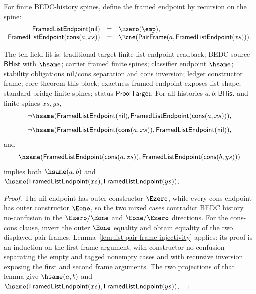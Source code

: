 \begin{definition}
\label{def:framed-list-endpoint}
For finite BEDC-history spines, define the framed endpoint by recursion on the
spine:
$$
\begin{array}{rcl}
\mathsf{FramedListEndpoint}(\mathsf{nil}) &=& \Ezero(\emp),\\
\mathsf{FramedListEndpoint}(\mathsf{cons}(a,xs)) &=&
\Eone(\mathsf{PairFrame}(a,\mathsf{FramedListEndpoint}(xs))).
\end{array}
$$
\end{definition}

\begin{theorem}
\label{thm:framed-list-endpoint-no-confusion-cons-inversion}
The ten-field fit is: traditional target finite-list endpoint readback; BEDC
source $\mathsf{BHist}$ with $\hsame$; carrier framed finite spines; classifier
endpoint $\hsame$; stability obligations nil/cons separation and cons inversion;
ledger constructor frame; core theorem this block; exactness framed endpoint
exposes list shape; standard bridge finite spines; status
$\mathsf{ProofTarget}$. For all histories $a,b:\mathsf{BHist}$ and finite
spines $xs,ys$,
$$
\neg\hsame(\mathsf{FramedListEndpoint}(\mathsf{nil}),
\mathsf{FramedListEndpoint}(\mathsf{cons}(a,xs))),
$$
$$
\neg\hsame(\mathsf{FramedListEndpoint}(\mathsf{cons}(a,xs)),
\mathsf{FramedListEndpoint}(\mathsf{nil})),
$$
and
$$
\hsame(\mathsf{FramedListEndpoint}(\mathsf{cons}(a,xs)),
\mathsf{FramedListEndpoint}(\mathsf{cons}(b,ys)))
$$
implies both $\hsame(a,b)$ and
$\hsame(\mathsf{FramedListEndpoint}(xs),\mathsf{FramedListEndpoint}(ys))$.
\end{theorem}
\begin{proof}
The nil endpoint has outer constructor $\Ezero$, while every cons endpoint has
outer constructor $\Eone$, so the two mixed cases contradict BEDC history
no-confusion in the $\Ezero/\Eone$ and $\Eone/\Ezero$ directions. For the
cons-cons clause, invert the outer $\Eone$ equality and obtain equality of the
two displayed pair frames. Lemma~\ref{lem:list-pair-frame-injectivity} applies:
its proof is an induction on the first frame argument, with constructor
no-confusion separating the empty and tagged nonempty cases and with recursive
inversion exposing the first and second frame arguments. The two projections of
that lemma give $\hsame(a,b)$ and
$\hsame(\mathsf{FramedListEndpoint}(xs),\mathsf{FramedListEndpoint}(ys))$.
\end{proof}

